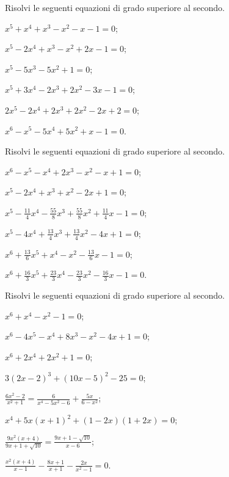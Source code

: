 \begin{esercizio}[\Ast]
 \label{ese:5.58}
Risolvi le seguenti equazioni di grado superiore al secondo.
\begin{multicols}{2}
\begin{enumeratea}
\item $x^5+x^4+x^3-x^2-x-1=0$;
\item $x^5-2x^4+x^3-x^2+2x-1=0$;
\item $x^5-5x^3-5x^2+1=0$;
\item $x^5+3x^4-2x^3+2x^2-3x-1=0$;
\item $2x^5-2x^4+2x^3+2x^2-2x+2=0$;
\item $x^6-x^5-5x^4+5x^2+x-1=0$.
\end{enumeratea}
\end{multicols}
\end{esercizio}

\begin{esercizio}[\Ast]
 \label{ese:5.59}
Risolvi le seguenti equazioni di grado superiore al secondo.
\begin{multicols}{2}
\begin{enumeratea}
\item $x^6-x^5-x^4+2x^3-x^2-x+1=0$;
\item $x^5-2x^4+x^3+x^2-2x+1=0$;
\item $x^5-\frac{11} 4x^4-\frac{55} 8x^3+\frac{55} 8x^2+\frac{11} 4x-1=0$;
\item $x^5-4x^4+\frac{13} 4x^3+\frac{13} 4x^2-4x+1=0$;
\item $x^6+\frac{13} 6x^5+x^4-x^2-\frac{13} 6x-1=0$;
\item $x^6+\frac{16} 3x^5+\frac{23} 3x^4-\frac{23} 3x^2-\frac{16} 3x-1=0$.
\end{enumeratea}
\end{multicols}
\end{esercizio}

\begin{esercizio}[\Ast]
 \label{ese:5.60}
Risolvi le seguenti equazioni di grado superiore al secondo.
\begin{multicols}{2}
\begin{enumeratea}
\item $x^6+x^4-x^2-1=0$;
\item $x^6-4x^5-x^4+8x^3-x^2-4x+1=0$;
\item $x^6+2x^4+2x^2+1=0$;
\item $3(2x-2)^3+(10x-5)^2-25=0$;
\item $\frac{6x^2-2}{x^2+1}=\frac 6{x^4-5x^2-6}+\frac{5x}{6-x^2}$;
\item $x^4+5x(x+1)^2+(1-2x)(1+2x)=0$;
\item $\frac{9x^2(x+4)}{9x+1+\sqrt{10}}=\frac{9x+1-\sqrt{10}}{x-6}$;
\item $\frac{x^2(x+4)}{x-1}-\frac{8x+1}{x+1}-\frac{2x}{x^2-1}=0$.
\end{enumeratea}
\end{multicols}
\end{esercizio}

